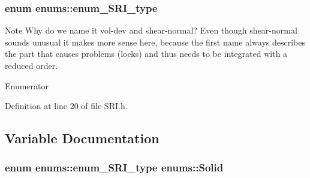 \subsubsection[{\texorpdfstring{enum\+\_\+\+S\+R\+I\+\_\+type}{enum_SRI_type}}]{\setlength{\rightskip}{0pt plus 5cm}enum {\bf enums\+::enum\+\_\+\+S\+R\+I\+\_\+type}}\hypertarget{namespaceenums_ad159a7d6539f111883db3b07c09601a8}{}\label{namespaceenums_ad159a7d6539f111883db3b07c09601a8}
\begin{DoxyNote}{Note}
Why do we name it vol-\/dev and shear-\/normal? Even though shear-\/normal sounds unusual it makes more sense here, because the first name always describes the part that causes problems (locks) and thus needs to be integrated with a reduced order. 
\end{DoxyNote}
\begin{Desc}
\item[Enumerator]\par
\begin{description}
\item[{\em 
vol\+\_\+dev\+\_\+split\hypertarget{namespaceenums_ad159a7d6539f111883db3b07c09601a8ad2c871b65148302b24a39fac6cedfd40}{}\label{namespaceenums_ad159a7d6539f111883db3b07c09601a8ad2c871b65148302b24a39fac6cedfd40}
}]\item[{\em 
shear\+\_\+normal\+\_\+split\hypertarget{namespaceenums_ad159a7d6539f111883db3b07c09601a8a2754f7ec0e001029442600188c83d582}{}\label{namespaceenums_ad159a7d6539f111883db3b07c09601a8a2754f7ec0e001029442600188c83d582}
}]\end{description}
\end{Desc}


Definition at line 20 of file S\+R\+I.\+h.



\subsection{Variable Documentation}
\subsubsection[{\texorpdfstring{Solid}{Solid}}]{\setlength{\rightskip}{0pt plus 5cm}enum {\bf enums\+::enum\+\_\+\+S\+R\+I\+\_\+type} enums\+::\+Solid}\hypertarget{namespaceenums_aea86a2beeb3b43f96447126c7f5dd2f3}{}\label{namespaceenums_aea86a2beeb3b43f96447126c7f5dd2f3}
